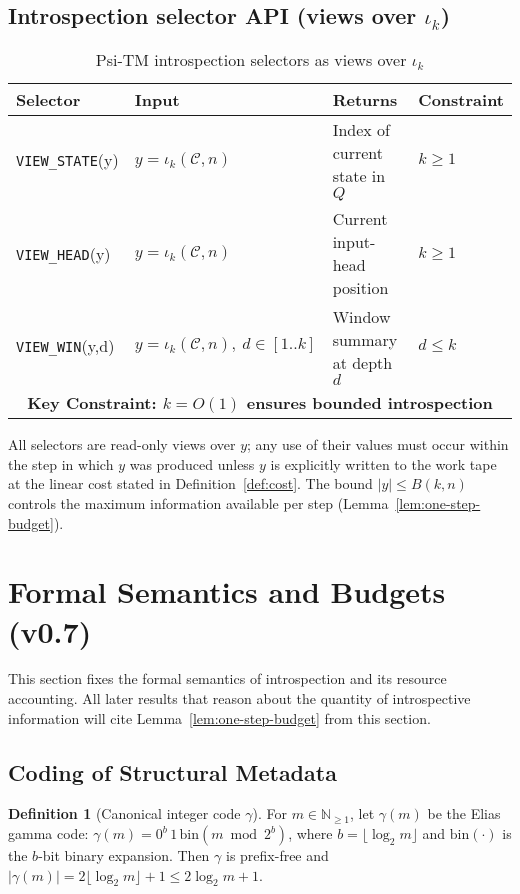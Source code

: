 \documentclass[11pt]{article}
\theoremstyle{definition}
\newtheorem{definition}[theorem]{Definition}
\begin{document}
\subsection{Introspection selector API (views over $\iota_k$)}

\begin{table}[ht]
\centering
\caption{Psi-TM introspection selectors as views over $\iota_k$}
\label{tab:introspection-api}
\begin{tabular}{|l|l|l|l|}
\hline
\textbf{Selector} & \textbf{Input} & \textbf{Returns} & \textbf{Constraint} \\
\hline
\texttt{VIEW\_STATE}(y) & $y=\iota_k(\mathcal{C},n)$ & Index of current state in $Q$ & $k \ge 1$ \\
\hline
\texttt{VIEW\_HEAD}(y) & $y=\iota_k(\mathcal{C},n)$ & Current input-head position & $k \ge 1$ \\
\hline
\texttt{VIEW\_WIN}(y,d) & $y=\iota_k(\mathcal{C},n),\ d\in[1..k]$ & Window summary at depth $d$ & $d \le k$ \\
\hline
\multicolumn{4}{|c|}{\textbf{Key Constraint: $k = O(1)$ ensures bounded introspection}} \\
\hline
\end{tabular}
\end{table}

All selectors are read-only views over $y$; any use of their values must occur within the step in which $y$ was produced unless $y$ is explicitly written to the work tape at the linear cost stated in Definition~\ref{def:cost}. The bound $|y|\le B(k,n)$ controls the maximum information available per step (Lemma~\ref{lem:one-step-budget}).

\section{Formal Semantics and Budgets (v0.7)}

This section fixes the formal semantics of introspection and its resource accounting. All later results that reason about the quantity of introspective information will cite Lemma~\ref{lem:one-step-budget} from this section.

\subsection{Coding of Structural Metadata}

\begin{definition}[Canonical integer code $\gamma$]
\label{def:gamma}
For $m\in\mathbb{N}_{\ge1}$, let $\gamma(m)$ be the Elias gamma code: $\gamma(m)=0^{b}\,1\,\mathrm{bin}(m\bmod 2^{b})$, where $b=\lfloor\log_2 m\rfloor$ and $\mathrm{bin}(\cdot)$ is the $b$-bit binary expansion. Then $\gamma$ is prefix-free and $|\gamma(m)|=2\lfloor\log_2 m\rfloor+1\le 2\log_2 m + 1$.
\end{definition}
\end{document}
